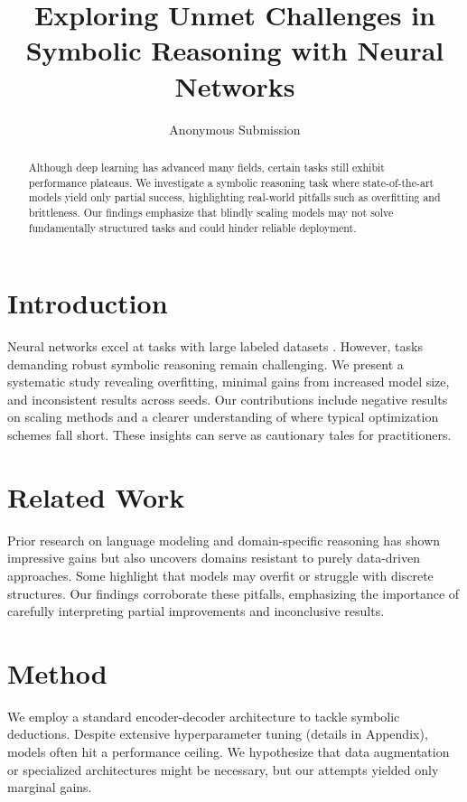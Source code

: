 \documentclass[11pt]{article}
\title{Exploring Unmet Challenges in Symbolic Reasoning with Neural Networks}
\author{
  Anonymous Submission
}
\date{}
\begin{document}
\maketitle

\begin{abstract}
Although deep learning has advanced many fields, certain tasks still exhibit performance plateaus. We investigate a symbolic reasoning task where state-of-the-art models yield only partial success, highlighting real-world pitfalls such as overfitting and brittleness. Our findings emphasize that blindly scaling models may not solve fundamentally structured tasks and could hinder reliable deployment.
\end{abstract}

\section{Introduction}
Neural networks excel at tasks with large labeled datasets \citep{lecun2015deep}. However, tasks demanding robust symbolic reasoning remain challenging. We present a systematic study revealing overfitting, minimal gains from increased model size, and inconsistent results across seeds. Our contributions include negative results on scaling methods and a clearer understanding of where typical optimization schemes \citep{kingma2014adam} fall short. These insights can serve as cautionary tales for practitioners.

\section{Related Work}
Prior research on language modeling \citep{devlin2019bert} and domain-specific reasoning has shown impressive gains but also uncovers domains resistant to purely data-driven approaches. Some highlight that models may overfit or struggle with discrete structures. Our findings corroborate these pitfalls, emphasizing the importance of carefully interpreting partial improvements and inconclusive results.

\section{Method}
We employ a standard encoder-decoder architecture to tackle symbolic deductions. Despite extensive hyperparameter tuning (details in Appendix), models often hit a performance ceiling. We hypothesize that data augmentation or specialized architectures might be necessary, but our attempts yielded only marginal gains.
\end{document}
